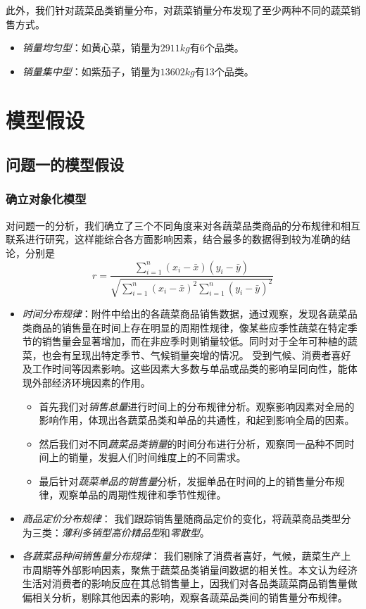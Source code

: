 \documentclass{article}
\begin{document}
此外，我们针对蔬菜品类销量分布，对蔬菜销量分布发现了至少两种不同的蔬菜销售方式。
\begin{itemize}
    \item \textit{销量均匀型}：如黄心菜，销量为$2911 kg$有6个品类。
    \item \textit{销量集中型}：如紫茄子，销量为$13602 kg$有13个品类。
\end{itemize}
\section{模型假设}

\subsection{问题一的模型假设}

\subsubsection{确立对象化模型}
对问题一的分析，我们确立了三个不同角度来对各蔬菜品类商品的分布规律和相互联系进行研究，这样能综合各方面影响因素，结合最多的数据得到较为准确的结论，分别是
\[
r = \frac{
    \sum_{i=1}^{n} (x_i - \bar{x})(y_i - \bar{y})
}{
    \sqrt{
        \sum_{i=1}^{n} (x_i - \bar{x})^2
        \sum_{i=1}^{n} (y_i - \bar{y})^2
    }
}
\]
\begin{itemize}
    \item \textit{时间分布规律}：附件中给出的各蔬菜商品销售数据，通过观察，发现各蔬菜品类商品的销售量在时间上存在明显的周期性规律，像某些应季性蔬菜在特定季节的销售量会显著增加，而在非应季时则销量较低。同时对于全年可种植的蔬菜，也会有呈现出特定季节、气候销量突增的情况。
    受到气候、消费者喜好及工作时间等因素影响。这些因素大多数与单品或品类的影响呈同向性，能体现外部经济环境因素的作用。

    \begin{itemize}
        \item 首先我们对\textit{销售总量}进行时间上的分布规律分析。观察影响因素对全局的影响作用，体现出各蔬菜品类和单品的共通性，和起到影响全局的因素。
        \item 然后我们对不同\textit{蔬菜品类销量}的时间分布进行分析，观察同一品种不同时间上的销量，发掘人们时间维度上的不同需求。
        \item 最后针对\textit{蔬菜单品的销售量}分析，发掘单品在时间的上的销售量分布规律，观察单品的周期性规律和季节性规律。
    \end{itemize}
    \item \textit{商品定价分布规律}：
    我们跟踪销售量随商品定价的变化，将蔬菜商品类型分为三类：\textit{薄利多销型}\textit{高价精品型}和\textit{零散型}。
    \item \textit{各蔬菜品种间销售量分布规律}：
    我们剔除了消费者喜好，气候，蔬菜生产上市周期等外部影响因素，聚焦于蔬菜品类销量间数据的相关性。本文认为经济生活对消费者的影响反应在其总销售量上，因我们对各品类蔬菜商品销售量做偏相关分析，剔除其他因素的影响，观察各蔬菜品类间的销售量分布规律。
\end{itemize}
\end{document}
